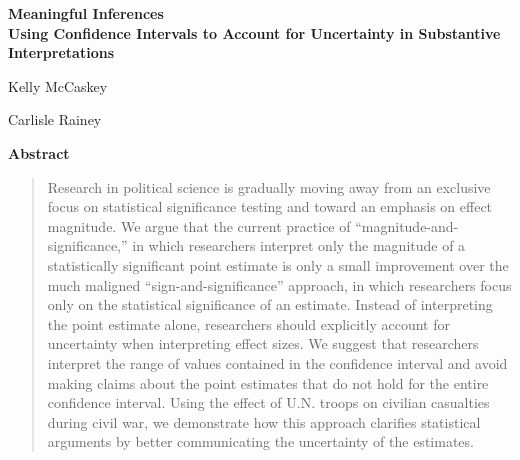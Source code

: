 \documentclass[12pt]{article}
\begin{document}
\begin{center}
{\LARGE \textbf{Meaningful Inferences}}\\\vspace{2mm}
{ \textbf{Using Confidence Intervals to Account for Uncertainty in Substantive Interpretations}}\\\vspace{2mm}


\vspace{10mm}

Kelly McCaskey

\vspace{3mm}

Carlisle Rainey
\end{center}

\vspace{10mm}

{\centerline{\textbf{Abstract}}}
\begin{quote}\noindent
Research in political science is gradually moving away from an exclusive focus on statistical significance testing and toward an emphasis on effect magnitude. We argue that the current practice of ``magnitude-and-significance,'' in which researchers interpret only the magnitude of a statistically significant point estimate is only a small improvement over the much maligned ``sign-and-significance'' approach, in which researchers focus only on the statistical significance of an estimate. Instead of interpreting the point estimate alone, researchers should explicitly account for uncertainty when interpreting effect sizes. We suggest that researchers interpret the range of values contained in the confidence interval and avoid making claims about the point estimates that do not hold for the entire confidence interval. Using the effect of U.N. troops on civilian casualties during civil war, we demonstrate how this approach clarifies statistical arguments by better communicating the uncertainty of the estimates.
 \end{quote}
\end{document}
